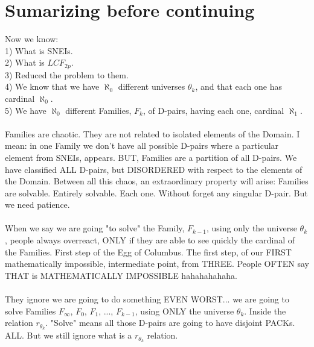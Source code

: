	\section {Sumarizing before continuing}
	
		\noindent
		Now we know:\\
		1) What is SNEIs.\\
		2) What is $LCF_{2p}$.\\
		3) Reduced the problem to them. \\
		4) We know that we have $\aleph_{0}$ different universes $\theta_{k}$, and that each one has cardinal $\aleph_{0}$. \\
		5) We have $\aleph_{0}$ different Families, $F_{k}$, of D-pairs, having each one, cardinal $\aleph_{1}$.
		\\\\
		
		\noindent
		Families are chaotic. They are not related to isolated elements of the Domain. I mean: in one Family we don't have all possible D-pairs where a particular element from SNEIs, appears. BUT, Families are a partition of all D-pairs. We have classified ALL D-pairs, but DISORDERED with respect to the elements of the Domain. Between all this chaos, an extraordinary property will arise: Families are solvable. Entirely solvable. Each one. Without forget any singular D-pair. But we need patience.
		\\\\
		
		\noindent
		When we say we are going "to solve" the Family, $F_{k-1}$, using only the universe $\theta_{k}$, people always overreact, ONLY if they are able to see quickly the cardinal of the Families. First step of the Egg of Columbus. The first step, of our FIRST mathematically impossible, intermediate point, from THREE. People OFTEN say THAT is MATHEMATICALLY IMPOSSIBLE hahahahahaha.
		\\\\
		
		\noindent
		They ignore we are going to do something EVEN WORST... we are going to solve Families $F_{\infty}$, $F_{0}$, $F_{1}$, ..., $F_{k-1}$, using ONLY the universe $\theta_{k}$. Inside the relation $r_{\theta_{k}}$. "Solve" means all those D-pairs are going to have disjoint PACKs. ALL. But we still ignore what is a $r_{\theta_{k}}$ relation.
		\\\\
\newpage
		
		
		
		
				
		
		
	
	